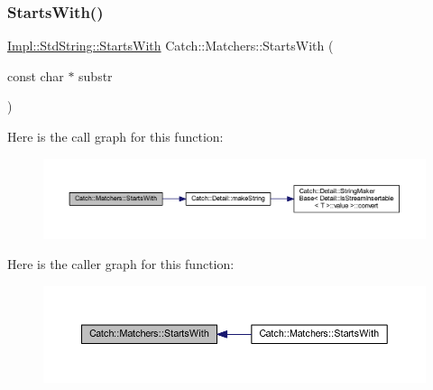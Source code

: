 \subsubsection{\texorpdfstring{Starts\+With()}{StartsWith()}\hspace{0.1cm}{\footnotesize\ttfamily [2/2]}}
{\footnotesize\ttfamily \hyperlink{struct_catch_1_1_matchers_1_1_impl_1_1_std_string_1_1_starts_with}{Impl\+::\+Std\+String\+::\+Starts\+With} Catch\+::\+Matchers\+::\+Starts\+With (\begin{DoxyParamCaption}\item[{const char $\ast$}]{substr }\end{DoxyParamCaption})\hspace{0.3cm}{\ttfamily [inline]}}

Here is the call graph for this function\+:\nopagebreak
\begin{figure}[H]
\begin{center}
\leavevmode
\includegraphics[width=350pt]{namespace_catch_1_1_matchers_a031985c11b8c8bb62585b3904f9fd2b0_cgraph}
\end{center}
\end{figure}
Here is the caller graph for this function\+:\nopagebreak
\begin{figure}[H]
\begin{center}
\leavevmode
\includegraphics[width=350pt]{namespace_catch_1_1_matchers_a031985c11b8c8bb62585b3904f9fd2b0_icgraph}
\end{center}
\end{figure}
